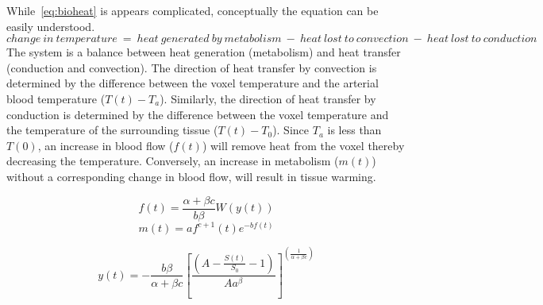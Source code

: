     While~\cref{eq:bioheat} is appears complicated, conceptually the equation can be easily understood.
    \begin{equation}    
      \label{eq:soteroexplaiend}
      change\ in\ temperature\ =\ heat\ generated\ by\ metabolism\ -\ heat\ lost\ to\ convection\ -\ heat\ lost\ to\ conduction
    \end{equation}
    The system is a balance between heat generation (metabolism) and heat transfer (conduction and convection).  The direction of heat transfer by convection is determined by the difference between the voxel temperature and the arterial blood temperature ($T(t) - T_a$).  Similarly, the direction of heat transfer by conduction is determined by the difference between the voxel temperature and the temperature of the surrounding tissue ($T(t) - T_0$).  Since $T_a$ is less than $T(0)$, an increase in blood flow ($f(t)$) will remove heat from the voxel thereby decreasing the temperature.  Conversely, an increase in metabolism ($m(t)$) without a corresponding change in blood flow, will result in tissue warming.  
    
    \begin{equation}
      \label{eq:f}
      f(t)=\frac{\alpha+\beta c}{b \beta}W(y(t))
    \end{equation}
    \begin{equation}
      \label{eq:m} 
      m(t)=af^{c+1}(t)e^{-bf(t)}
    \end{equation}
    
    \begin{equation}
      \label{eq:y} 
    	y(t)=-\frac{b \beta}{\alpha+\beta c} \left[\frac{(A-\frac{S(t)}{S_{0}}-1)}{A a^{\beta}}\right]^{\left(\frac{1}{\alpha+\beta c}\right)} 
    \end{equation}
    
